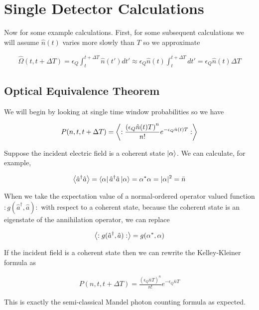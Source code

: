 \documentclass[12pt]{article}
\newcommand{\ep}{\epsilon}
\begin{document}
\section{Single Detector Calculations}
Now for some example calculations. First, for some subsequent calculations we will assume $\hat{n}(t)$ varies more slowly than $T$ so we approximate

\begin{align}
\hat{\Omega}(t,t+\Delta T) = \ep_Q\int_t^{t+\Delta T} \hat{n}(t') dt' \approx \ep_Q \hat{n}(t) \int_t^{t+\Delta T} dt' =  \ep_Q \hat{n}(t)\Delta T
\end{align} 

\subsection{Optical Equivalence Theorem}

We will begin by looking at single time window probabilities so we have

\begin{align}
P(n,t,t+\Delta T) = \Braket{:\frac{\left(\ep_Q \hat{n}(t)T \right)^n}{n!}e^{-\ep_Q \hat{n}(t) T}:}
\end{align}

Suppose the incident electric field is a coherent state $\ket{\alpha}$. We can calculate, for example,

\begin{align}
\Braket{\hat{a}^{\dag} \hat{a}} = \bra{\alpha}\hat{a}^{\dag} \hat{a} \ket{\alpha} = \alpha^* \alpha = |\alpha|^2 = \bar{n}
\end{align}

When we take the expectation value of a normal-ordered operator valued function $:g(\hat{a}^{\dag},\hat{a}):$ with respect to a coherent state, because the coherent state is an eigenstate of the annihilation operator, we can replace

\begin{align}
\Braket{:g(\hat{a}^{\dag},\hat{a}):} = g(\alpha^*,\alpha)
\end{align}

If the incident field is a coherent state then we can rewrite the Kelley-Kleiner formula as

\begin{align}
P(n,t,t+\Delta T) = \frac{\left(\ep_Q \bar{n} T\right)^n}{n!} e^{-\ep_Q \bar{n}T}
\end{align}

This is exactly the semi-classical Mandel photon counting formula as expected.
\end{document}
